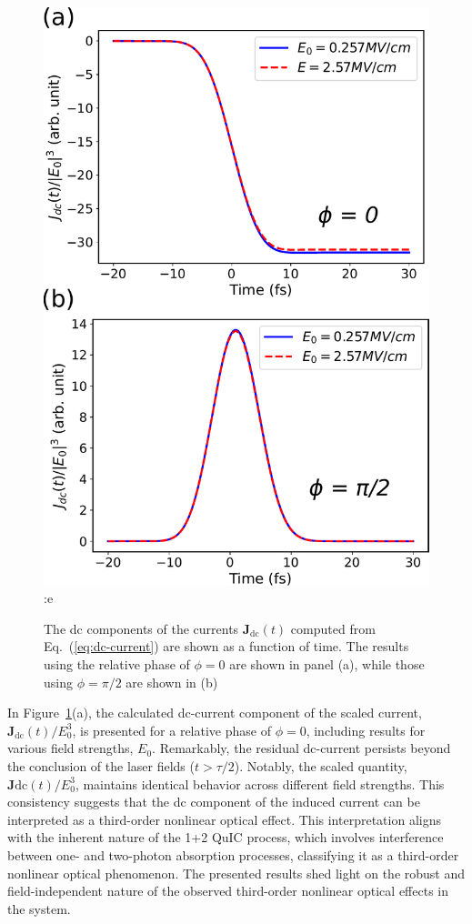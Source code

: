 \begin{figure}[htbp]
\centering
 \includegraphics[width=0.8\linewidth]{pic/dc_current.pdf}:e
\caption{\label{fig:dc_current} 
The dc components of the currents $\mathbf{J}_{\text{dc}}(t)$ computed from Eq.~(\ref{eq:dc-current}) are shown as a function of time. The results using the relative phase of $\phi=0$ are shown in panel (a), while those using $\phi=\pi/2$ are shown in (b) }
\end{figure}

In Figure~\ref{fig:dc_current}(a), the calculated dc-current component of the scaled current, $\mathbf{J}_{\text{dc}}(t)/E_0^3$, is presented for a relative phase of $\phi=0$, including results for various field strengths, $E_0$. Remarkably, the residual dc-current persists beyond the conclusion of the laser fields ($t>\tau/2$). Notably, the scaled quantity, $\mathbf{J}{\text{dc}}(t)/E_0^3$, maintains identical behavior across different field strengths. This consistency suggests that the dc component of the induced current can be interpreted as a third-order nonlinear optical effect. This interpretation aligns with the inherent nature of the 1+2 \gls{QuIC} process, which involves interference between one- and two-photon absorption processes, classifying it as a third-order nonlinear optical phenomenon. The presented results shed light on the robust and field-independent nature of the observed third-order nonlinear optical effects in the system.

